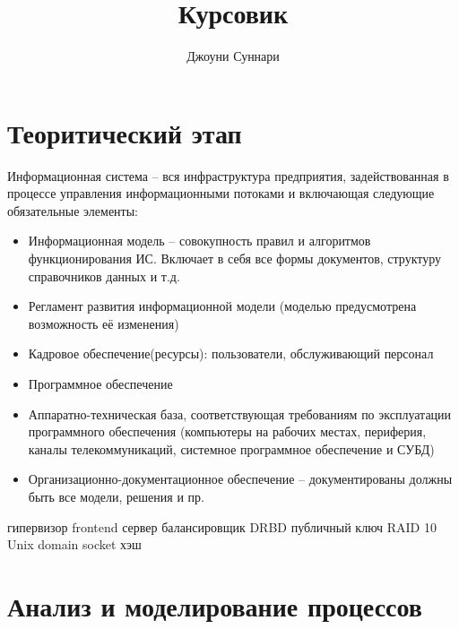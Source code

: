 \documentclass{article}
\author{Джоуни Суннари}
\title{Курсовик}
\begin{document}
\maketitle
\pagebreak
\tableofcontents
\pagebreak

\newcommand{\myparagraph}[1]{\paragraph{#1}\mbox{}\\}

\section{Теоритический этап}
Информационная система – вся инфраструктура предприятия, задействованная в процессе управления информационными потоками и включающая следующие обязательные элементы:
\begin{itemize}
    \item{Информационная модель – совокупность правил и алгоритмов функционирования ИС. Включает в себя все формы документов, структуру справочников данных и т.д.}
    \item{Регламент развития информационной модели (моделью предусмотрена возможность её изменения)}
    \item{Кадровое обеспечение(ресурсы): пользователи, обслуживающий персонал }
    \item{Программное обеспечение}
    \item{Аппаратно-техническая база, соответствующая требованиям по эксплуатации программного обеспечения (компьютеры на рабочих местах, периферия, каналы телекоммуникаций, системное программное обеспечение и СУБД) }
    \item{Организационно-документационное обеспечение – документированы должны быть все модели, решения и пр.}
\end{itemize}

гипервизор
frontend сервер
балансировщик
DRBD
публичный ключ
RAID 10
Unix domain socket
хэш

\pagebreak

\section{Анализ и моделирование процессов}
\end{document}

